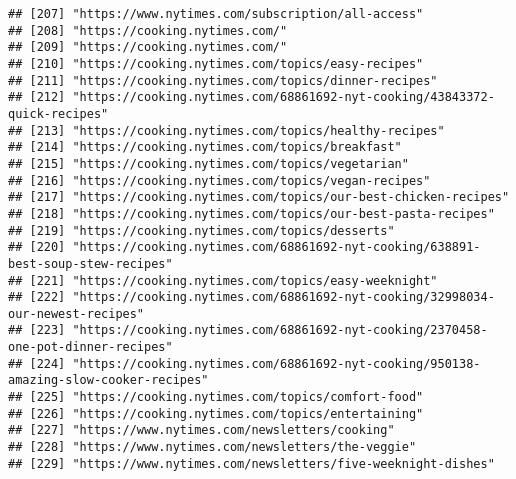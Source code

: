 \documentclass[
]{article}
\begin{document}
\begin{verbatim}
## [207] "https://www.nytimes.com/subscription/all-access"                                                           
## [208] "https://cooking.nytimes.com/"                                                                              
## [209] "https://cooking.nytimes.com/"                                                                              
## [210] "https://cooking.nytimes.com/topics/easy-recipes"                                                           
## [211] "https://cooking.nytimes.com/topics/dinner-recipes"                                                         
## [212] "https://cooking.nytimes.com/68861692-nyt-cooking/43843372-quick-recipes"                                   
## [213] "https://cooking.nytimes.com/topics/healthy-recipes"                                                        
## [214] "https://cooking.nytimes.com/topics/breakfast"                                                              
## [215] "https://cooking.nytimes.com/topics/vegetarian"                                                             
## [216] "https://cooking.nytimes.com/topics/vegan-recipes"                                                          
## [217] "https://cooking.nytimes.com/topics/our-best-chicken-recipes"                                               
## [218] "https://cooking.nytimes.com/topics/our-best-pasta-recipes"                                                 
## [219] "https://cooking.nytimes.com/topics/desserts"                                                               
## [220] "https://cooking.nytimes.com/68861692-nyt-cooking/638891-best-soup-stew-recipes"                            
## [221] "https://cooking.nytimes.com/topics/easy-weeknight"                                                         
## [222] "https://cooking.nytimes.com/68861692-nyt-cooking/32998034-our-newest-recipes"                              
## [223] "https://cooking.nytimes.com/68861692-nyt-cooking/2370458-one-pot-dinner-recipes"                           
## [224] "https://cooking.nytimes.com/68861692-nyt-cooking/950138-amazing-slow-cooker-recipes"                       
## [225] "https://cooking.nytimes.com/topics/comfort-food"                                                           
## [226] "https://cooking.nytimes.com/topics/entertaining"                                                           
## [227] "https://www.nytimes.com/newsletters/cooking"                                                               
## [228] "https://www.nytimes.com/newsletters/the-veggie"                                                            
## [229] "https://www.nytimes.com/newsletters/five-weeknight-dishes"                                                 

\end{verbatim}
\end{document}
